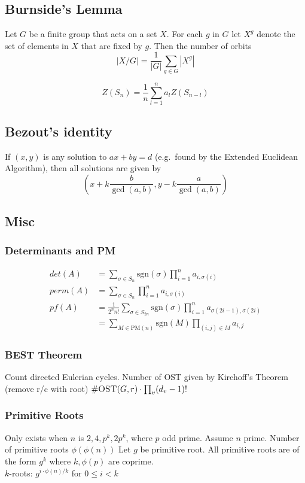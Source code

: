\documentclass[15pt,a4paper]{article}
\begin{document}
\begin{landscape}
\begin{multicols*}{3}
\subsection{Burnside's Lemma}
Let $G$ be a finite group that acts on a set $X$. For each $g$ in $G$
let $X^g$ denote the set of elements in $X$ that are fixed by $g$. Then
the number of orbits \[ |X/G| = \frac{1}{|G|} \sum_{g\in G} |X^g| \]

\[
Z(S_n) = \frac{1}{n} \sum_{l=1}^n a_l Z(S_{n-l})
\]

\subsection{Bezout's identity}
If $(x,y)$ is any solution to $ax+by=d$ (e.g.\ found by the Extended
Euclidean Algorithm), then all solutions are given by \[
\left(x+k\frac{b}{\gcd(a,b)}, y-k\frac{a}{\gcd(a,b)}\right) \]

\subsection{Misc}
\subsubsection{Determinants and PM}
\begin{align*}
det(A) &= \sum_{\sigma \in S_n}\text{sgn}(\sigma)\prod_{i = 1}^n a_{i,\sigma(i)}\\
perm(A) &= \sum_{\sigma \in S_n} \prod_{i = 1}^n a_{i,\sigma(i)}\\
pf(A) &= \frac{1}{2^nn!}\sum_{\sigma \in S_{2n}} \text{sgn}(\sigma)\prod_{i = 1}^n a_{\sigma(2i-1),\sigma(2i)}\\ &= \sum_{M \in \text{PM}(n)} \text{sgn}(M) \prod_{(i,j) \in M} a_{i,j}
\end{align*}

\subsubsection{BEST Theorem}
Count directed Eulerian cycles. Number of OST given by
Kirchoff's Theorem (remove r/c with root) $\#\textsc{OST}(G,r)
\cdot \prod_{v}(d_v-1)!$

\subsubsection{Primitive Roots}
Only exists when $n$ is $2, 4, p^k, 2p^k$, where $p$ odd prime. Assume
$n$ prime. Number of primitive roots $\phi(\phi(n))$
Let $g$ be primitive root. All primitive roots are of the form $g^k$
where $k,\phi(p)$ are coprime.\\ $k$-roots:
$g^{i \cdot \phi(n) / k}$ for $0 \leq i < k$

\end{multicols*}
\end{landscape}
\end{document}
